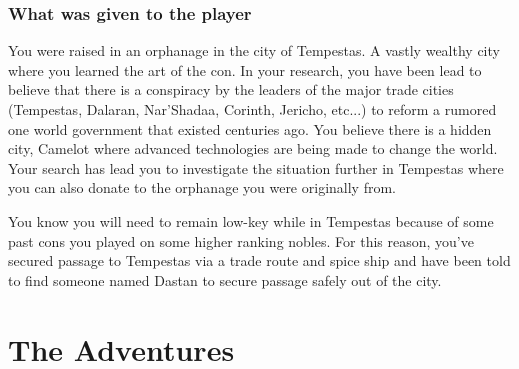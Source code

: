 \subsubsection{What was given to the player}

You were raised in an orphanage in the city of Tempestas. A vastly wealthy city where you learned the art of the con. In your research, you have been lead to believe that there is a conspiracy by the leaders of the major trade cities (Tempestas, Dalaran, Nar'Shadaa, Corinth, Jericho, etc...) to reform a rumored one world government that existed centuries ago. You believe there is a hidden city, Camelot where advanced technologies are being made to change the world. Your search has lead you to investigate the situation further in Tempestas where you can also donate to the orphanage you were originally from. 

You know you will need to remain low-key while in Tempestas because of some past cons you played on some higher ranking nobles. For this reason, you've secured passage to Tempestas via a trade route and spice ship and have been told to find someone named Dastan to secure passage safely out of the city. 

\section{The Adventures}







